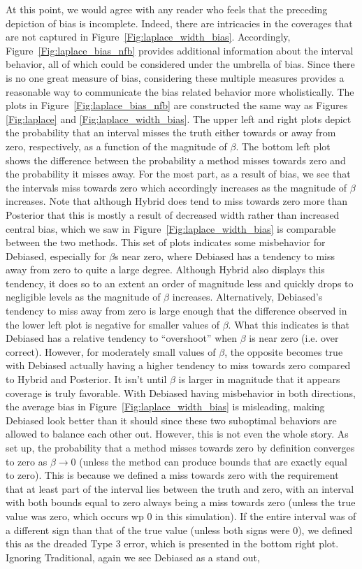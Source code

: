 At this point, we would agree with any reader who feels that the preceding depiction of bias is incomplete. Indeed, there are intricacies in the coverages that are not captured in Figure~\ref{Fig:laplace_width_bias}. Accordingly, Figure~\ref{Fig:laplace_bias_nfb} provides additional information about the interval behavior, all of which could be considered under the umbrella of bias. Since there is no one great measure of bias, considering these multiple measures provides a reasonable way to communicate the bias related behavior more wholistically. The plots in Figure~\ref{Fig:laplace_bias_nfb} are constructed the same way as Figures \ref{Fig:laplace} and \ref{Fig:laplace_width_bias}. The upper left and right plots depict the probability that an interval misses the truth either towards or away from zero, respectively, as a function of the magnitude of $\beta$. The bottom left plot shows the difference between the probability a method misses towards zero and the probability it misses away. For the most part, as a result of bias, we see that the intervals miss towards zero which accordingly increases as the magnitude of $\beta$ increases. Note that although Hybrid does tend to miss towards zero more than Posterior that this is mostly a result of decreased width rather than increased central bias, which we saw in Figure~\ref{Fig:laplace_width_bias} is comparable between the two methods. This set of plots indicates some misbehavior for Debiased, especially for $\beta$s near zero, where Debiased has a tendency to miss away from zero to quite a large degree. Although Hybrid also displays this tendency, it does so to an extent an order of magnitude less and quickly drops to negligible levels as the magnitude of $\beta$ increases. Alternatively, Debiased's tendency to miss away from zero is large enough that the difference observed in the lower left plot is negative for smaller values of $\beta$. What this indicates is that Debiased has a relative tendency to ``overshoot'' when $\beta$ is near zero (i.e. over correct). However, for moderately small values of $\beta$, the opposite becomes true with Debiased actually having a higher tendency to miss towards zero compared to Hybrid and Posterior. It isn't until $\beta$ is larger in magnitude that it appears coverage is truly favorable. With Debiased having misbehavior in both directions, the average bias in Figure~\ref{Fig:laplace_width_bias} is misleading, making Debiased look better than it should since these two suboptimal behaviors are allowed to balance each other out. However, this is not even the whole story. As set up, the probability that a method misses towards zero by definition converges to zero as $\beta \rightarrow 0$ (unless the method can produce bounds that are exactly equal to zero). This is because we defined a miss towards zero with the requirement that at least part of the interval lies between the truth and zero, with an interval with both bounds equal to zero always being a miss towards zero (unless the true value was zero, which occurs wp 0 in this simulation). If the entire interval was of a different sign than that of the true value (unless both signs were 0), we defined this as the dreaded Type 3 error, which is presented in the bottom right plot. Ignoring Traditional, again we see Debiased as a stand out, 